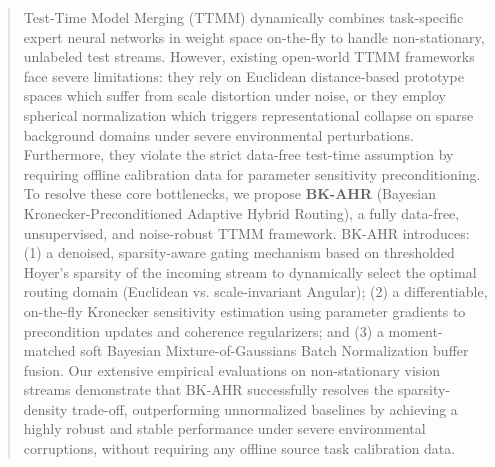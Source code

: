 \documentclass{article}
\theoremstyle{plain}
\theoremstyle{definition}
\theoremstyle{remark}
\begin{document}

\printAffiliationsAndNotice{}

\begin{abstract}
  Test-Time Model Merging (TTMM) dynamically combines task-specific expert neural networks in weight space on-the-fly to handle non-stationary, unlabeled test streams. However, existing open-world TTMM frameworks face severe limitations: they rely on Euclidean distance-based prototype spaces which suffer from scale distortion under noise, or they employ spherical normalization which triggers representational collapse on sparse background domains under severe environmental perturbations. Furthermore, they violate the strict data-free test-time assumption by requiring offline calibration data for parameter sensitivity preconditioning. To resolve these core bottlenecks, we propose \textbf{BK-AHR} (Bayesian Kronecker-Preconditioned Adaptive Hybrid Routing), a fully data-free, unsupervised, and noise-robust TTMM framework. BK-AHR introduces: (1) a denoised, sparsity-aware gating mechanism based on thresholded Hoyer's sparsity of the incoming stream to dynamically select the optimal routing domain (Euclidean vs. scale-invariant Angular); (2) a differentiable, on-the-fly Kronecker sensitivity estimation using parameter gradients to precondition updates and coherence regularizers; and (3) a moment-matched soft Bayesian Mixture-of-Gaussians Batch Normalization buffer fusion. Our extensive empirical evaluations on non-stationary vision streams demonstrate that BK-AHR successfully resolves the sparsity-density trade-off, outperforming unnormalized baselines by achieving a highly robust and stable performance under severe environmental corruptions, without requiring any offline source task calibration data.
\end{abstract}
\end{document}
